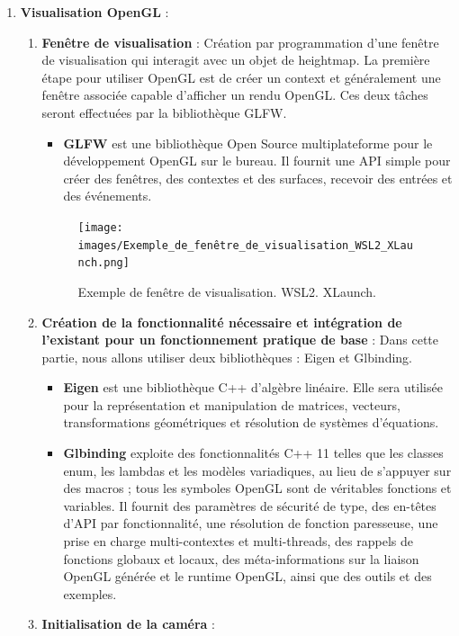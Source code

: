 \documentclass[12pt]{report}
\begin{document}
\begin{enumerate}
    \item \textbf{Visualisation OpenGL} :
    \begin{enumerate}
        \item \textbf{Fenêtre de visualisation} : 
            Création par programmation d'une fenêtre de visualisation qui interagit avec un objet de heightmap. La première étape pour utiliser OpenGL est de créer un context et généralement une fenêtre associée capable d'afficher un rendu OpenGL. Ces deux tâches seront effectuées par la bibliothèque GLFW. 
            \begin{itemize}
                \item \textbf{GLFW} est une bibliothèque Open Source multiplateforme pour le développement OpenGL sur le bureau. Il fournit une API simple pour créer des fenêtres, des contextes et des surfaces, recevoir des entrées et des événements.
            \end{itemize}
            \begin{figure}[h]
                \centering
                \texttt{[image: images/Exemple\_de\_fenêtre\_de\_visualisation\_WSL2\_XLaunch.png]}
                \caption{Exemple de fenêtre de visualisation. WSL2. XLaunch.}
            \end{figure}
        \item \textbf{Création de la fonctionnalité nécessaire et intégration de l'existant pour un fonctionnement pratique de base} :
        Dans cette partie, nous allons utiliser deux bibliothèques : Eigen et Glbinding. 
        \begin{itemize}
            \item \textbf{Eigen} est une bibliothèque C++ d'algèbre linéaire. Elle sera utilisée pour la représentation et manipulation de matrices, vecteurs, transformations géométriques et résolution de systèmes d'équations.
            \item \textbf{Glbinding} exploite des fonctionnalités C++ 11 telles que les classes enum, les lambdas et les modèles variadiques, au lieu de s'appuyer sur des macros ; tous les symboles OpenGL sont de véritables fonctions et variables. Il fournit des paramètres de sécurité de type, des en-têtes d'API par fonctionnalité, une résolution de fonction paresseuse, une prise en charge multi-contextes et multi-threads, des rappels de fonctions globaux et locaux, des méta-informations sur la liaison OpenGL générée et le runtime OpenGL, ainsi que des outils et des exemples.
        \end{itemize}
        \item \textbf{Initialisation de la caméra} : 

\end{enumerate}
\end{enumerate}
\end{document}
